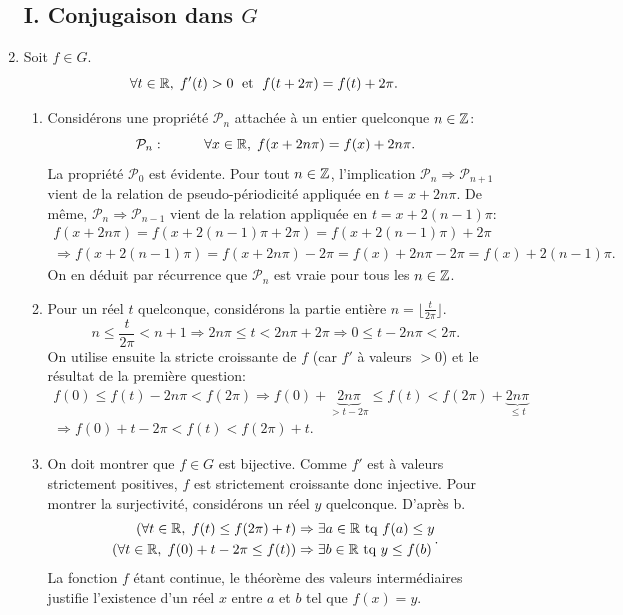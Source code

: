 \begin{enumerate}
\subsection*{I. Conjugaison dans $G$}
\item Soit $f\in G$.
\[
 \forall t\in \mathbb{R},\;  f'(t) > 0 \; \text{ et } \; f(t+2\pi) = f(t) + 2\pi.
\]

\begin{enumerate}
  \item Considérons une propriété $\mathcal{P}_n$ attachée à un entier quelconque $n\in \mathbb{Z}$:
\[
  \mathcal{P}_n: \hspace{1cm} \forall x \in \mathbb{R}, \; f(x + 2n \pi) = f(x) + 2n \pi.
\]
La propriété $\mathcal{P}_0$ est évidente. Pour tout $n \in \mathbb{Z}$, l'implication $\mathcal{P}_n \Rightarrow \mathcal{P}_{n+1}$ vient de la relation de pseudo-périodicité appliquée en $t = x + 2n\pi$. De même, $\mathcal{P}_n \Rightarrow \mathcal{P}_{n-1}$ vient de la relation appliquée en $t = x + 2(n-1)\pi$:
\begin{multline*}
  f(x+2n\pi) = f(x+2(n-1)\pi + 2\pi) = f(x+2(n-1)\pi) + 2\pi \\
  \Rightarrow f(x+2(n-1)\pi) = f(x+2n\pi) - 2\pi = f(x) + 2n\pi -2\pi = f(x) +2(n-1)\pi.
\end{multline*}
On en déduit par  récurrence que $\mathcal{P}_n$ est vraie pour tous les $n\in \mathbb{Z}$.

  \item Pour un réel $t$ quelconque, considérons la partie entière $n = \lfloor \frac{t}{2\pi} \rfloor$.
\[
  n \leq \frac{t}{2\pi} < n+1 
  \Rightarrow 2n\pi \leq t < 2n\pi + 2\pi
  \Rightarrow 0 \leq t - 2n\pi < 2\pi .
\]
On utilise ensuite la stricte croissante de $f$ (car $f'$ à valeurs $>0$) et le résultat de la première question:
\begin{multline*}
  f(0) \leq f(t) - 2n\pi < f(2\pi)
  \Rightarrow f(0) + \underset{>t - 2\pi}{\underbrace{2n\pi}} \leq f(t) < f(2\pi) + \underset{\leq t}{\underbrace{2n\pi}} \\
  \Rightarrow f(0) + t - 2\pi < f(t) < f(2\pi) + t.
\end{multline*}

  \item On doit montrer que $f\in G$ est bijective. Comme $f'$ est à valeurs strictement positives, $f$ est strictement croissante donc injective. Pour montrer la surjectivité, considérons un réel $y$ quelconque. D'après b.
\[
  \begin{aligned}
    \left( \forall t \in \mathbb{R}, \; f(t) \leq f(2\pi) + t \right) &\Rightarrow \exists a \in \mathbb{R} \text{ tq } f(a) \leq  y \\
    \left( \forall t \in \mathbb{R}, \; f(0) + t -2\pi \leq f(t) \right) &\Rightarrow \exists b \in \mathbb{R} \text{ tq } y \leq f(b)
  \end{aligned} .
\]
La fonction $f$ étant continue, le théorème des valeurs intermédiaires justifie l'existence d'un réel $x$ entre $a$ et $b$ tel que $f(x) = y$.
\end{enumerate}


\end{enumerate}
